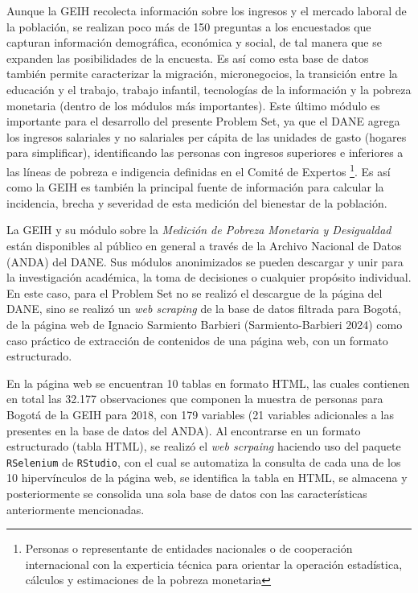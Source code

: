 \documentclass[
  11pt,
  letterpaper,
]{article}
\begin{document}
Aunque la GEIH recolecta información sobre los ingresos y el mercado
laboral de la población, se realizan poco más de 150 preguntas a los
encuestados que capturan información demográfica, económica y social, de
tal manera que se expanden las posibilidades de la encuesta. Es así como
esta base de datos también permite caracterizar la migración,
micronegocios, la transición entre la educación y el trabajo, trabajo
infantil, tecnologías de la información y la pobreza monetaria (dentro
de los módulos más importantes). Este último módulo es importante para
el desarrollo del presente Problem Set, ya que el DANE agrega los
ingresos salariales y no salariales per cápita de las unidades de gasto
(hogares para simplificar), identificando las personas con ingresos
superiores e inferiores a las líneas de pobreza e indigencia definidas
en el Comité de Expertos
\footnote{Personas o representante de entidades nacionales o de cooperación internacional con la experticia técnica para orientar la operación estadística, cálculos y estimaciones de la pobreza monetaria}.
Es así como la GEIH es también la principal fuente de información para
calcular la incidencia, brecha y severidad de esta medición del
bienestar de la población.

La GEIH y su módulo sobre la \emph{Medición de Pobreza Monetaria y
Desigualdad} están disponibles al público en general a través de la
Archivo Nacional de Datos (ANDA) del DANE. Sus módulos anonimizados se
pueden descargar y unir para la investigación académica, la toma de
decisiones o cualquier propósito individual. En este caso, para el
Problem Set no se realizó el descargue de la página del DANE, sino se
realizó un \emph{web scraping} de la base de datos filtrada para Bogotá,
de la página web de Ignacio Sarmiento Barbieri (Sarmiento-Barbieri 2024)
como caso práctico de extracción de contenidos de una página web, con un
formato estructurado.

En la página web se encuentran 10 tablas en formato HTML, las cuales
contienen en total las 32.177 observaciones que componen la muestra de
personas para Bogotá de la GEIH para 2018, con 179 variables (21
variables adicionales a las presentes en la base de datos del ANDA). Al
encontrarse en un formato estructurado (tabla HTML), se realizó el
\emph{web scrpaing} haciendo uso del paquete \texttt{RSelenium} de
\texttt{RStudio}, con el cual se automatiza la consulta de cada una de
los 10 hipervínculos de la página web, se identifica la tabla en HTML,
se almacena y posteriormente se consolida una sola base de datos con las
características anteriormente mencionadas.
\end{document}
